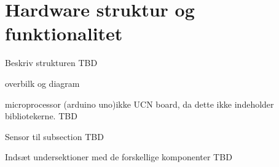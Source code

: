 \section{Hardware struktur og funktionalitet}
Beskriv strukturen TBD

\hfill \break
overbilk og diagram

microprocessor (arduino uno)ikke UCN board, da dette ikke indeholder bibliotekerne. TBD

Sensor til subsection TBD



Indsæt undersektioner med de forskellige komponenter TBD
